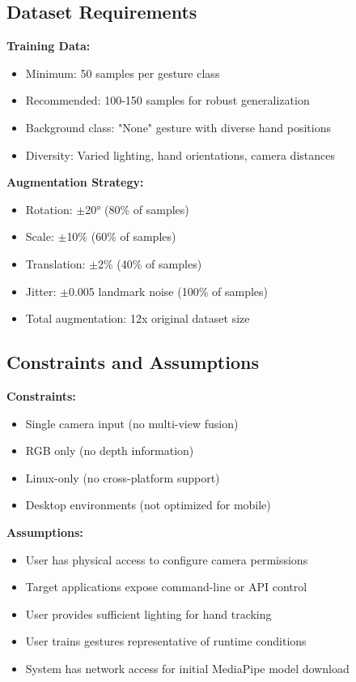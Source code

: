 \documentclass[11pt,a4paper]{article}
\begin{document}
\subsection{Dataset Requirements}

\textbf{Training Data:}
\begin{itemize}
\item Minimum: 50 samples per gesture class
\item Recommended: 100-150 samples for robust generalization
\item Background class: "None" gesture with diverse hand positions
\item Diversity: Varied lighting, hand orientations, camera distances
\end{itemize}

\textbf{Augmentation Strategy:}
\begin{itemize}
\item Rotation: $\pm$20° (80\% of samples)
\item Scale: $\pm$10\% (60\% of samples)
\item Translation: $\pm$2\% (40\% of samples)
\item Jitter: $\pm$0.005 landmark noise (100\% of samples)
\item Total augmentation: 12x original dataset size
\end{itemize}

\subsection{Constraints and Assumptions}

\textbf{Constraints:}
\begin{itemize}
\item Single camera input (no multi-view fusion)
\item RGB only (no depth information)
\item Linux-only (no cross-platform support)
\item Desktop environments (not optimized for mobile)
\end{itemize}

\textbf{Assumptions:}
\begin{itemize}
\item User has physical access to configure camera permissions
\item Target applications expose command-line or API control
\item User provides sufficient lighting for hand tracking
\item User trains gestures representative of runtime conditions
\item System has network access for initial MediaPipe model download
\end{itemize}
\end{document}
